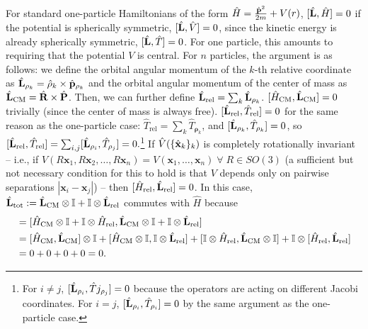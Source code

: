  For standard one-particle Hamiltonians of the form $\hat{H}=\frac{\hat{\mathbf{p}}^2}{2m} + V(r)$, $[\hat{\mathbf{L}}, \hat{H}]=0$ if the potential is spherically symmetric, $[\hat{\mathbf{L}},\hat{V}]=0$, since the kinetic energy is already spherically symmetric, $[\hat{\mathbf{L}}, \hat{T}]=0$. For one particle, this amounts to requiring that the potential $V$ is central. For $n$ particles, the argument is as follows: we define the orbital angular momentum of the $k$-th relative coordinate as $\hat{\mathbf{L}}_{\mathbf{\rho}_k} = \hat{\mathbf{\rho}}_k\times \hat{\mathbf{p}}_{\mathbf{\rho}_k}$ and the orbital angular momentum of the center of mass as $\hat{\mathbf{L}}_{\text{CM}} = \hat{\mathbf{R}} \times \hat{\mathbf{P}}$. Then, we can further define $\hat{\mathbf{L}}_{\text{rel}}=\sum_k \hat{\mathbf{L}}_{\mathbf{\rho}_k}$. $[\hat{H}_{\text{CM}},\hat{\mathbf{L}}_{\text{CM}}]=0$ trivially (since the center of mass is always free). $[\hat{\mathbf{L}}_\text{rel},\hat{T}_\text{rel}]=0$ for the same reason as the one-particle case: $\hat{T}_\text{rel}=\sum_k \hat{T}_{\mathbf{\rho}_k}$, and $[\hat{\mathbf{L}}_{\mathbf{\rho}_k},\hat{T}_{\mathbf{\rho}_k}]=0$, so $[\hat{\mathbf{L}}_{\text{rel}}, \hat{T}_{\text{rel}}]=\sum_{i,j}[\hat{\mathbf{L}}_{\mathbf{\rho}_i},\hat{T}_{\mathbf{\rho}_j}]=0.$\footnote{
For $i\ne j$, $[\hat{\mathbf{L}}_{\mathbf{\rho}_i}, \hat{T}j_{\mathbf{\rho}_j}]=0$ because the operators are acting on different Jacobi coordinates. For $i=j$, $[\hat{\mathbf{L}}_{\mathbf{\rho}_i},\hat{T}_{\mathbf{\rho}_i}]=0$ by the same argument as the one-particle case.
}
If $\hat{V}(\{\hat{\mathbf{x}}_k\}_k)$ is completely rotationally invariant -- i.e., if $V(R\mathbf{x}_1, R\mathbf{x}_2, \dots, R\mathbf{x}_n)=V(\mathbf{x}_1, \dots, \mathbf{x}_n)\;\forall\; R\in SO(3)$ (a sufficient but not necessary condition for this to hold is that $V$ depends only on pairwise separations $|\mathbf{x}_i-\mathbf{x}_j|$) -- then $[\hat{H}_{\text{rel}},\hat{\mathbf{L}}_{\text{rel}}]=0$. In this case, $\hat{\mathbf{L}}_{\text{tot}}:=\hat{\mathbf{L}}_{\text{CM}}\otimes \mathbb{I}+\mathbb{I}\otimes\hat{\mathbf{L}}_{\text{rel}}$ commutes with $\hat{H}$ because
\begin{align*}
    [\hat{H}, \vecop{L}_\text{tot}] &= [\hat{H}_{\text{CM}}\otimes \mathbb{I}+\mathbb{I}\otimes \hat{H}_{\text{rel}}, \vecop{L}_{\text{CM}}\otimes\mathbb{I} + \mathbb{I}\otimes \vecop{L}_{\text{rel}}]\\
    &= [\hat{H}_{\text{CM}}, \vecop{L}_{\text{CM}}] \otimes \mathbb{I} + [\hat{H}_\text{CM}\otimes \mathbb{I}, \mathbb{I}\otimes \vecop{L}_\text{rel}]+[\mathbb{I}\otimes \hat{H}_\text{rel}, \vecop{L}_\text{CM}\otimes \mathbb{I}] + \mathbb{I}\otimes[\hat{H}_{\text{rel}},\vecop{L}_\text{rel}]\\
    &= 0 + 0 + 0 + 0 = 0.
\end{align*}
